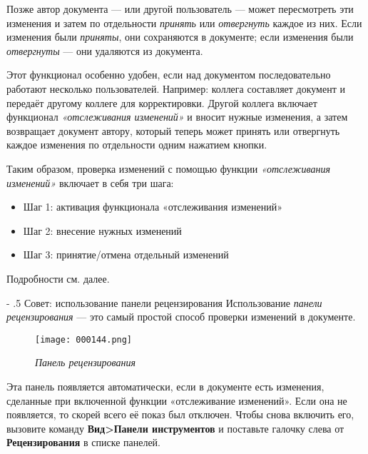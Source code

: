 ﻿\documentclass[a4paper,10pt]{article}
\makeatletter
\renewcommand\paragraph{%
   \@startsection{paragraph}{4}{0mm}%
      {-\baselineskip}%
      {.5\baselineskip}%
      {\normalfont\normalsize\bfseries}}
\makeatother
\begin{document}
Позже автор документа — или другой пользователь — может пересмотреть эти изменения и затем по отдельности \textit{принять} или \textit{отвергнуть} каждое из них. Если изменения были \textit{приняты}, они сохраняются в документе; если изменения были \textit{отвергнуты} — они удаляются из документа.

Этот функционал особенно удобен, если над документом последовательно работают несколько пользователей. Например: коллега составляет документ и передаёт другому коллеге для корректировки. Другой коллега включает функционал \textit{«отслеживания изменений»} и вносит нужные изменения, а затем возвращает документ автору, который теперь может принять или отвергнуть каждое изменения по отдельности одним нажатием кнопки.

Таким образом, проверка изменений с помощью функции \textit{«отслеживания изменений»} включает в себя три шага:
\begin{itemize}
 \item Шаг 1: активация функционала «отслеживания изменений»
 \item Шаг 2: внесение нужных изменений
 \item Шаг 3: принятие/отмена отдельный изменений
\end{itemize}

Подробности см. далее.

\paragraph{Совет: использование панели рецензирования}
Использование \textit{панели рецензирования} — это самый простой способ проверки изменений в документе.

\begin{figure}[ht]
\texttt{[image: 000144.png]}
\centering
\caption{\textit{Панель рецензирования}}
\end{figure}

Эта панель появляется автоматически, если в документе есть изменения, сделанные при включенной функции «отслеживание изменений». Если она не появляется, то скорей всего её показ был отключен. Чтобы снова включить его, вызовите команду \textbf{Вид>Панели инструментов} и поставьте галочку слева от \textbf{Рецензирования} в списке панелей.
\end{document}
